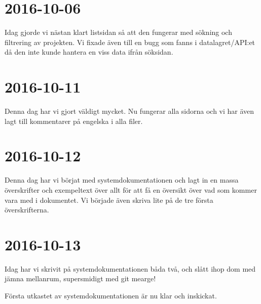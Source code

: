 \documentclass{TDP003mall}
\begin{document}
\section*{2016-10-06}
Idag gjorde vi nästan klart listsidan så att den fungerar med sökning och filtrering av projekten. Vi fixade även till en bugg som fanns i datalagret/API:et då den inte kunde hantera en viss data ifrån söksidan.

\section*{2016-10-11}
Denna dag har vi gjort väldigt mycket. Nu fungerar alla sidorna och vi har även lagt till kommentarer på engelska i alla filer.

\section*{2016-10-12}
Denna dag har vi börjat med systemdokumentationen och lagt in en massa överskrifter och exempeltext över allt för att få en översikt över vad som kommer vara med i dokumentet. Vi började även skriva lite på de tre första överskrifterna.

\section*{2016-10-13}
Idag har vi skrivit på systemdokumentationen båda två, och slått ihop dom med jämna mellanrum, supersmidigt med git mearge!

Första utkastet av systemdokumentationen är nu klar och inskickat.
\end{document}
